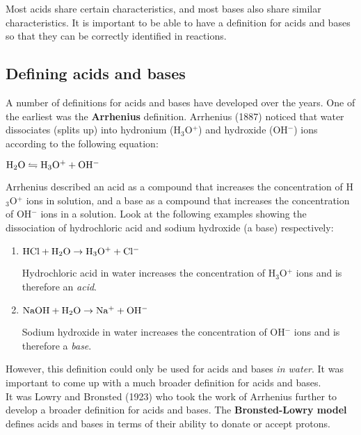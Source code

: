 Most acids share certain characteristics, and most bases also share similar characteristics. It is important to be able to have a definition for acids and bases so that they can be correctly identified in reactions.

\subsection{Defining acids and bases}

A number of definitions for acids and bases have developed over the years. One of the earliest was the \textbf{Arrhenius} definition. Arrhenius (1887) noticed that water dissociates (splits up) into hydronium (H$_{3}$O$^{+}$) and hydroxide (OH$^{-}$) ions according to the following equation:

\begin{center}
$\rm{H_{2}O \leftrightharpoons H_{3}O^{+} + OH^{-}}$
\end{center}


Arrhenius described an acid as a compound that increases the concentration of H$_{3}$O$^{+}$ ions in solution, and a base as a compound that increases the concentration of OH$^{-}$ ions in a solution. Look at the following examples showing the dissociation of hydrochloric acid and sodium hydroxide (a base) respectively:

\begin{enumerate}
\item{
$\rm{HCl + H_{2}O \rightarrow H_{3}O^{+} + Cl^{-}}$

Hydrochloric acid in water increases the concentration of H$_{3}$O$^{+}$ ions and is therefore an \textit{acid}.}

\item{$\rm{NaOH + H_{2}O \rightarrow Na^{+} + OH^{-}}$

Sodium hydroxide in water increases the concentration of OH$^{-}$ ions and is therefore a \textit{base}.} 
\end{enumerate}

However, this definition could only be used for acids and bases \textit{in water}. It was important to come up with a much broader definition for acids and bases. \\ 

It was Lowry and Bronsted (1923) who took the work of Arrhenius further to develop a broader definition for acids and bases. The \textbf{Bronsted-Lowry model} defines acids and bases in terms of their ability to donate or accept protons.

